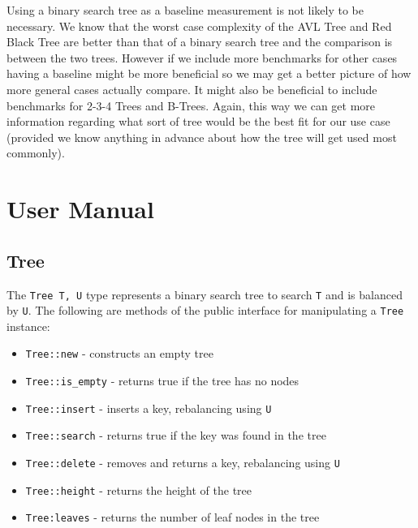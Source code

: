 \documentclass[11pt, letterpaper]{article}
\begin{document}
Using a binary search tree as a baseline measurement is not likely to be necessary.  We know that the worst case complexity of the AVL Tree and Red Black Tree are better than
that of a binary search tree and the comparison is between the two trees.  However if we include more benchmarks for other cases having a baseline might be more beneficial
so we may get a better picture of how more general cases actually compare.  It might also be beneficial to include benchmarks for 2-3-4 Trees and B-Trees.  Again, this way we can get
more information regarding what sort of tree would be the best fit for our use case (provided we know anything in advance about how the tree will get used most commonly).

\pagebreak

\section{User Manual}

\subsection{Tree}
The  \texttt{Tree T, U} type represents a binary search tree to search  \texttt{T} and is balanced by \texttt{U}.
The following are methods of the public interface for manipulating a \texttt{Tree} instance:
\begin{itemize}
    \item \texttt{Tree::new} - constructs an empty tree
    \item \texttt{Tree::is_empty} - returns true if the tree has no nodes
    \item \texttt{Tree::insert} - inserts a key, rebalancing using  \texttt{U}
    \item \texttt{Tree::search} - returns true if the key was found in the tree
    \item \texttt{Tree::delete} - removes and returns a key, rebalancing using  \texttt{U}
    \item \texttt{Tree::height} - returns the height of the tree
    \item \texttt{Tree:leaves} - returns the number of leaf nodes in the tree   
\end{itemize}
\end{document}
